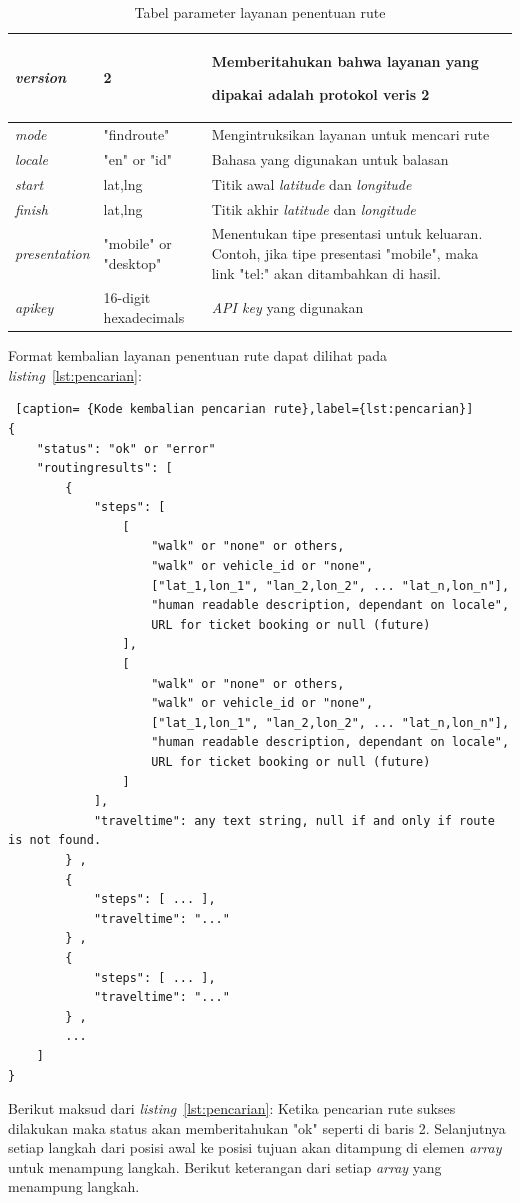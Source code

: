 \begin{table}[H]
	\centering
		\begin{tabular}{|p{2cm}|p{4cm}|p{8cm}|}
			\hline
			\textit{version} & 2 & Memberitahukan bahwa layanan yang \strut dipakai adalah protokol veris 2 \\ \hline
			\textit{mode} & "findroute" & Mengintruksikan layanan untuk mencari rute \\ \hline
			\textit{locale} & "en" or "id" & Bahasa yang digunakan untuk balasan \\ \hline
			\textit{start} & lat,lng & Titik awal \textit{latitude} dan \textit{longitude} \\ \hline
			\textit{finish} & lat,lng & Titik akhir \textit{latitude} dan \textit{longitude}  \\ \hline
			\textit{presentation} & "mobile" or "desktop" & Menentukan tipe presentasi untuk keluaran. Contoh, jika tipe presentasi "mobile", maka link "tel:" akan ditambahkan di hasil. \\ \hline
			\textit{apikey} & 16-digit hexadecimals & \textit{API key} yang digunakan \\ \hline
			\hline
		\end{tabular}
	\caption{Tabel parameter layanan penentuan rute}
	\label{tab:routingWebService}
\end{table}

Format kembalian layanan penentuan rute dapat dilihat pada \textit{listing}~\ref{lst:pencarian}:

\begin{lstlisting} [caption= {Kode kembalian pencarian rute},label={lst:pencarian}]
{ 
    "status": "ok" or "error" 
    "routingresults": [ 
        {
            "steps": [
                [
                    "walk" or "none" or others,
                    "walk" or vehicle_id or "none",
                    ["lat_1,lon_1", "lan_2,lon_2", ... "lat_n,lon_n"],
                    "human readable description, dependant on locale",
                    URL for ticket booking or null (future)
                ],
                [
                    "walk" or "none" or others,
                    "walk" or vehicle_id or "none",
                    ["lat_1,lon_1", "lan_2,lon_2", ... "lat_n,lon_n"],
                    "human readable description, dependant on locale",
                    URL for ticket booking or null (future)
                ]
            ],
            "traveltime": any text string, null if and only if route is not found.
        } ,
        {
            "steps": [ ... ],
            "traveltime": "..."
        } ,
        {
            "steps": [ ... ],
            "traveltime": "..."
        } ,
        ...     
    ]
}
\end{lstlisting}
Berikut maksud dari \textit{listing}~\ref{lst:pencarian}: \newline
\hspace{0.5cm} Ketika pencarian rute sukses dilakukan maka status akan memberitahukan "ok" seperti di baris 2. Selanjutnya setiap langkah dari posisi awal ke posisi tujuan akan ditampung di elemen \textit{array} untuk menampung langkah. Berikut keterangan dari setiap \textit{array} yang menampung langkah. 


